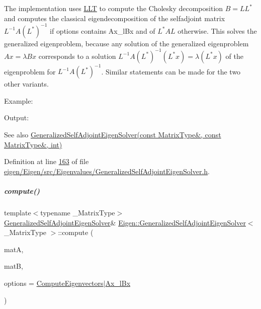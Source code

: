 The implementation uses \hyperlink{group___cholesky___module_class_eigen_1_1_l_l_t}{L\+LT} to compute the Cholesky decomposition $ B = LL^* $ and computes the classical eigendecomposition of the selfadjoint matrix $ L^{-1} A (L^*)^{-1} $ if {\ttfamily options} contains Ax\+\_\+l\+Bx and of $ L^{*} A L $ otherwise. This solves the generalized eigenproblem, because any solution of the generalized eigenproblem $ Ax = \lambda B x $ corresponds to a solution $ L^{-1} A (L^*)^{-1} (L^* x) = \lambda (L^* x) $ of the eigenproblem for $ L^{-1} A (L^*)^{-1} $. Similar statements can be made for the two other variants.

Example\+: 
\begin{DoxyCodeInclude}
\end{DoxyCodeInclude}
 Output\+: 
\begin{DoxyVerbInclude}
\end{DoxyVerbInclude}


\begin{DoxySeeAlso}{See also}
\hyperlink{group___eigenvalues___module_addc0409c9cb1a5ac9cbbd00efe68908e}{Generalized\+Self\+Adjoint\+Eigen\+Solver(const Matrix\+Type\&, const Matrix\+Type\&, int)} 
\end{DoxySeeAlso}


Definition at line \hyperlink{eigen_2_eigen_2src_2_eigenvalues_2_generalized_self_adjoint_eigen_solver_8h_source_l00163}{163} of file \hyperlink{eigen_2_eigen_2src_2_eigenvalues_2_generalized_self_adjoint_eigen_solver_8h_source}{eigen/\+Eigen/src/\+Eigenvalues/\+Generalized\+Self\+Adjoint\+Eigen\+Solver.\+h}.

\mbox{\label{group___eigenvalues___module_afe3f89bbcf982b534e5d4d3b1f58cdc2}} 
\subparagraph{\texorpdfstring{compute()}{compute()}\hspace{0.1cm}{\footnotesize\ttfamily [2/2]}}
{\footnotesize\ttfamily template$<$typename \+\_\+\+Matrix\+Type$>$ \\
\hyperlink{group___eigenvalues___module_class_eigen_1_1_generalized_self_adjoint_eigen_solver}{Generalized\+Self\+Adjoint\+Eigen\+Solver}\& \hyperlink{group___eigenvalues___module_class_eigen_1_1_generalized_self_adjoint_eigen_solver}{Eigen\+::\+Generalized\+Self\+Adjoint\+Eigen\+Solver}$<$ \+\_\+\+Matrix\+Type $>$\+::compute (\begin{DoxyParamCaption}\item[{const Matrix\+Type \&}]{matA,  }\item[{const Matrix\+Type \&}]{matB,  }\item[{int}]{options = {\ttfamily \hyperlink{group__enums_ggae3e239fb70022eb8747994cf5d68b4a9ada93d8885bde32b876ba4af01d3292cc}{Compute\+Eigenvectors}$\vert$\hyperlink{group__enums_ggae3e239fb70022eb8747994cf5d68b4a9a1a7cefbb22c2c3928d246b753cf53633}{Ax\+\_\+l\+Bx}} }\end{DoxyParamCaption})}



